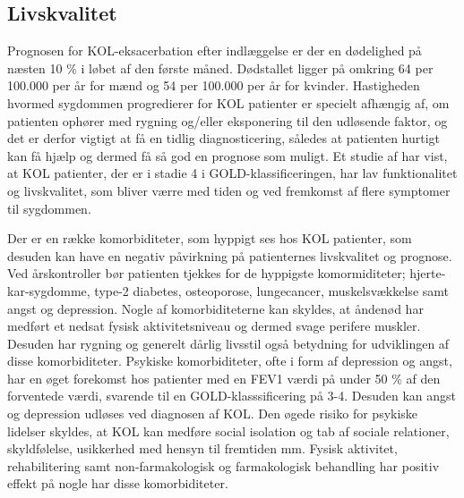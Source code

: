 \subsection{Livskvalitet}
Prognosen for KOL-eksacerbation efter indlæggelse er der en dødelighed på næsten 10 \% i løbet af den første måned. Dødstallet ligger på omkring 64 per 100.000 per år for mænd og 54 per 100.000 per år for kvinder.
Hastigheden hvormed sygdommen progredierer for KOL patienter er specielt afhængig af, om patienten ophører med rygning og/eller eksponering til den udløsende faktor, og det er derfor vigtigt at få en tidlig diagnosticering, således at patienten hurtigt kan få hjælp og dermed få så god en prognose som muligt. \cite{dsam2016}
Et studie af har vist, at KOL patienter, der er i stadie 4 i GOLD-klassificeringen, har lav funktionalitet og livskvalitet, som bliver værre med tiden og ved fremkomst af flere symptomer til sygdommen. \cite{Habraken2011}

Der er en række komorbiditeter, som hyppigt ses hos KOL patienter, som desuden kan have en negativ påvirkning på patienternes livskvalitet og prognose. Ved årskontroller bør patienten tjekkes for de hyppigste komormiditeter; hjerte-kar-sygdomme, type-2 diabetes, osteoporose, lungecancer, muskelsvækkelse samt angst og depression.
Nogle af komorbiditeterne kan skyldes, at åndenød har medført et nedsat fysisk aktivitetsniveau og dermed svage perifere muskler. Desuden har rygning og generelt dårlig livsstil også betydning for udviklingen af disse komorbiditeter. \cite{dsam2016}
Psykiske komorbiditeter, ofte i form af depression og angst, har en øget forekomst hos patienter med en FEV1 værdi på under 50 \% af den forventede værdi, svarende til en GOLD-klasssificering på 3-4. Desuden kan angst og depression udløses ved diagnosen af KOL. Den øgede risiko for psykiske lidelser skyldes, at KOL kan medføre social isolation og tab af sociale relationer, skyldfølelse, usikkerhed med hensyn til fremtiden mm. \cite{dsam2016}
Fysisk aktivitet, rehabilitering samt non-farmakologisk og farmakologisk behandling har positiv effekt på nogle har disse komorbiditeter. \cite{dsam2016}
